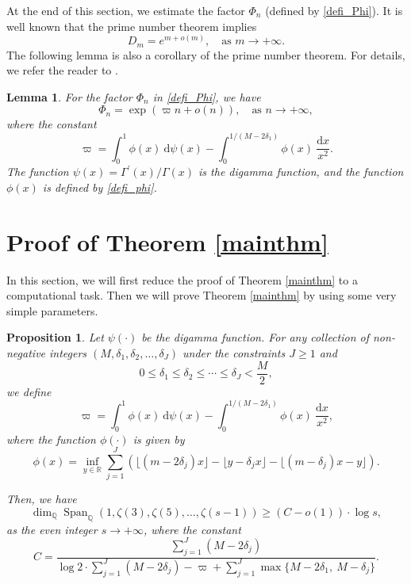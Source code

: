 \documentclass[12pt]{article}
\newtheorem{lemma}[theorem]{Lemma}
\newtheorem{proposition}[theorem]{Proposition}
\numberwithin{equation}{section}
\begin{document}
\bigskip

At the end of this section, we estimate the factor $\Phi_n$ (defined by \eqref{defi_Phi}). It is well known that the prime number theorem implies 
\begin{equation}\label{PNT}
D_m =e^{m+o(m)}, \quad \text{as~} m \to +\infty. 
\end{equation}
The following lemma is also a corollary of the prime number theorem. For details, we refer the reader to \cite[Lemma 4.4]{Zud2002}.
\begin{lemma}\label{Phi_est}
For the factor $\Phi_n$ in \eqref{defi_Phi}, we have
\[ \Phi_n = \exp\left( \varpi n + o(n) \right), \quad \text{as~} n \to +\infty,  \]
where the constant 
\begin{equation}\label{defi_varpi}
 \varpi = \int_{0}^{1} \phi(x)~\mathrm{d}\psi(x) - \int_{0}^{1/(M-2\delta_1)} \phi(x)~\frac{\mathrm{d}x}{x^2}.  
\end{equation}
The function $\psi(x) = \Gamma^{\prime}(x)/\Gamma(x)$ is the digamma function, and the function $\phi(x)$ is defined by \eqref{defi_phi}.
\end{lemma} 



\section{Proof of Theorem \ref{mainthm}}\label{Sect_proo}
In this section, we will first reduce the proof of Theorem \ref{mainthm} to a computational task. Then we will prove Theorem \ref{mainthm} by using some very simple parameters. 

\begin{proposition}\label{prop}
Let $\psi(\cdot)$ be the digamma function. For any collection of non-negative integers $(M,\delta_1,\delta_2,\ldots,\delta_J)$ under the constraints $J \geqslant 1$ and
\[ 	0 \leqslant \delta_1 \leqslant \delta_2 \leqslant \cdots \leqslant \delta_J < \frac{M}{2}, \]
we define
\[ \varpi = \int_{0}^{1} \phi(x)~\mathrm{d}\psi(x) - \int_{0}^{1/(M-2\delta_1)} \phi(x)~\frac{\mathrm{d}x}{x^2},   \]
where the function $\phi(\cdot)$ is given by
\[ \phi(x) = \inf_{y \in \mathbb{R}} \sum_{j=1}^{J}  \left( \lfloor(m-2\delta_j)x\rfloor - \lfloor y-\delta_j x \rfloor - \lfloor (m-\delta_j)x - y \rfloor \right). \]
	
Then, we have
\[ \dim_{\mathbb{Q}}\operatorname{Span}_{\mathbb{Q}}\left( 1,\zeta(3),\zeta(5),\ldots,\zeta(s-1) \right) \geqslant (C-o(1)) \cdot \log s, \]
as the even integer $s \to +\infty$, where the constant 
\begin{equation}\label{defi_C}
C = \frac{\sum_{j=1}^{J} (M-2\delta_j) }{\log2 \cdot \sum_{j=1}^{J}(M-2\delta_j)  - \varpi  + \sum_{j=1}^{J} \max\{ M-2\delta_1,~M-\delta_j \}}.
\end{equation}  
\end{proposition}
\end{document}
